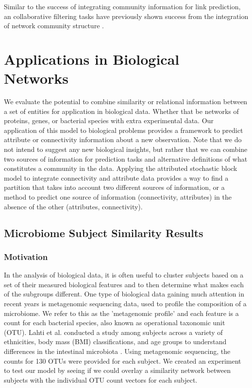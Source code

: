 Similar to the success of integrating community information for link prediction, an collaborative filtering tasks have previously shown success from the integration of network community structure \cite{collabComm}. 

\section{Applications in Biological Networks}
We evaluate the potential to combine similarity or relational information between a set of entities for application in biological data. Whether that be networks of proteins, genes, or bacterial species with extra experimental data. Our application of this model to biological problems provides a framework to predict attribute or connectivity information about a new observation.  Note that we do not intend to suggest any new biological insights, but rather that we can combine two sources of information for prediction tasks and alternative definitions of what constitutes a community in the data. Applying the attributed stochastic block model to integrate connectivity and attribute data provides a way to find a partition that takes into account two different sources of information, or a method to predict one source of information (connectivity, attributes) in the absence of the other (attributes, connectivity). 

\subsection{Microbiome Subject Similarity Results}

\subsubsection{Motivation}

In the analysis of biological data, it is often useful to cluster subjects based on a set of their measured biological features and to then determine what makes each of the subgroups different. One type of biological data gaining much attention in recent years is metagenomic sequencing data, used to profile the composition of a microbiome. We refer to this as the 'metagenomic profile' and each feature is a count for each bacterial species, also known as operational taxonomic unit (OTU). Lahti et al. conducted a study among subjects across a variety of ethnicities, body mass (BMI) classifications, and age groups to understand differences in the intestinal microbiota \cite{microbiomedata}. Using metagenomic sequencing, the counts for 130 OTUs were provided for each subject. We created an experiment to test our model by seeing if we could overlay a similarity network between subjects with the individual OTU count vectors for each subject. 

